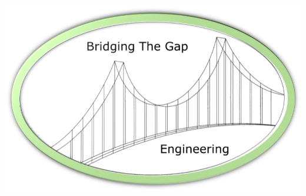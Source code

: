 \begin{titlepage}


\vspace{2.0cm} %

\includegraphics[width=0.75\linewidth, scale=1.5]{appendix/logoo}
\label{fig:logoo}




\vfill %

\end{titlepage}

\newpage